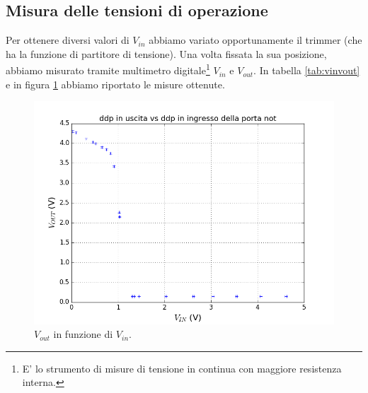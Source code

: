 \documentclass[10pt,a4paper]{article}
\begin{document}
\subsection{Misura delle tensioni di operazione}
Per ottenere diversi valori di $V_{in}$ abbiamo variato opportunamente il trimmer (che ha la funzione di partitore di tensione). Una volta fissata la sua posizione, abbiamo misurato tramite multimetro digitale\footnote{E' lo strumento di misure di tensione in continua con maggiore resistenza interna.} $V_{in}$ e $V_{out}$.
In tabella \ref{tab:vinvout} e in figura \ref{fig:vinvout} abbiamo riportato le misure ottenute.
\begin{figure}
\centering
\includegraphics[scale=0.9]{vinvout.png}
\caption{$V_{out}$ in funzione di $V_{in}$.\label{fig:vinvout}}
\end{figure}
\end{document}
